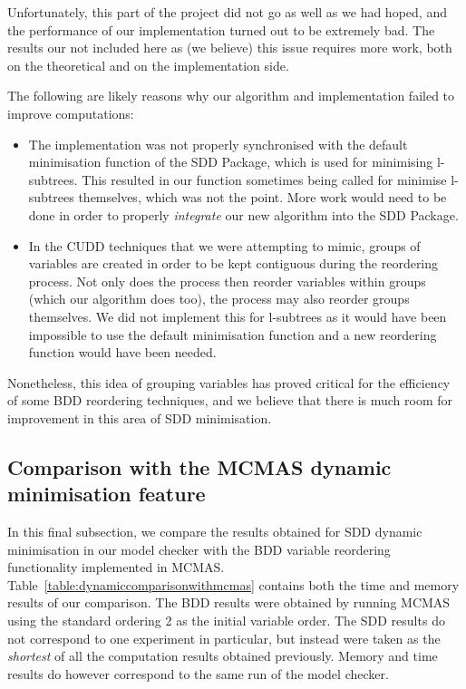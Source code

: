 \documentclass[11pt]{report}
\begin{document}
Unfortunately, this part of the project did not go as well as we had hoped, and the performance of our implementation turned out to be extremely bad. The results our not included here as (we believe) this issue requires more work, both on the theoretical and on the implementation side. 

The following are likely reasons why our algorithm and implementation failed to improve computations: 
\begin{itemize}
\item The implementation was not properly synchronised with the default minimisation function of the SDD Package, which is used for minimising l-subtrees. This resulted in our function sometimes being called for minimise l-subtrees themselves, which was not the point. More work would need to be done in order to properly \textit{integrate} our new algorithm into the SDD Package. 
\item In the CUDD techniques that we were attempting to mimic, groups of variables are created in order to be kept contiguous during the reordering process. Not only does the process then reorder variables within groups (which our algorithm does too), the process may also reorder groups themselves. We did not implement this for l-subtrees as it would have been impossible to use the default minimisation function and a new reordering function would have been needed. 
\end{itemize}

Nonetheless, this idea of grouping variables has proved critical for the efficiency of some BDD reordering techniques, and we believe that there is much room for improvement in this area of SDD minimisation.


\subsection{Comparison with the MCMAS dynamic minimisation feature} 
\label{daocomparison}

In this final subsection, we compare the results obtained for SDD dynamic minimisation in our model checker with the BDD variable reordering functionality implemented in MCMAS. Table~\ref{table:dynamiccomparisonwithmcmas} contains both the time and memory results of our comparison. The BDD results were obtained by running MCMAS using the standard ordering 2 as the initial variable order. The SDD results do not correspond to one experiment in particular, but instead were taken as the \textit{shortest} of all the computation results obtained previously. Memory and time results do however correspond to the same run of the model checker.
\end{document}
